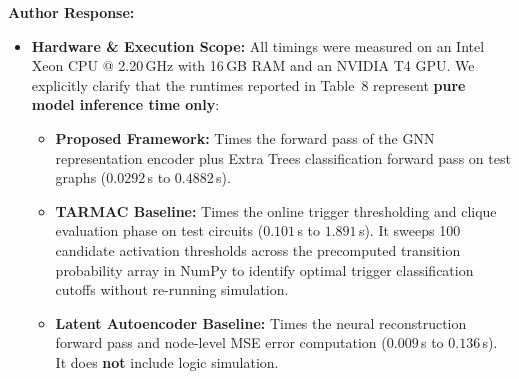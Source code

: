 \documentclass[11pt,a4paper]{article}
\newcommand{\authorresponse}{\noindent\textbf{Author Response:}}
\begin{document}
\authorresponse
\begin{itemize}[leftmargin=*]
    \item \textbf{Hardware \& Execution Scope:} All timings were measured on an Intel Xeon CPU @ 2.20\,GHz with 16\,GB RAM and an NVIDIA T4 GPU. We explicitly clarify that the runtimes reported in Table~8 represent \textbf{pure model inference time only}:
    \begin{itemize}
        \item \textbf{Proposed Framework:} Times the forward pass of the GNN representation encoder plus Extra Trees classification forward pass on test graphs ($0.0292$\,s to $0.4882$\,s).
        \item \textbf{TARMAC Baseline:} Times the online trigger thresholding and clique evaluation phase on test circuits ($0.101$\,s to $1.891$\,s). It sweeps 100 candidate activation thresholds across the precomputed transition probability array in NumPy to identify optimal trigger classification cutoffs without re-running simulation.
        \item \textbf{Latent Autoencoder Baseline:} Times the neural reconstruction forward pass and node-level MSE error computation ($0.009$\,s to $0.136$\,s). It does \textbf{not} include logic simulation.
    \end{itemize}


\end{itemize}
\end{document}
